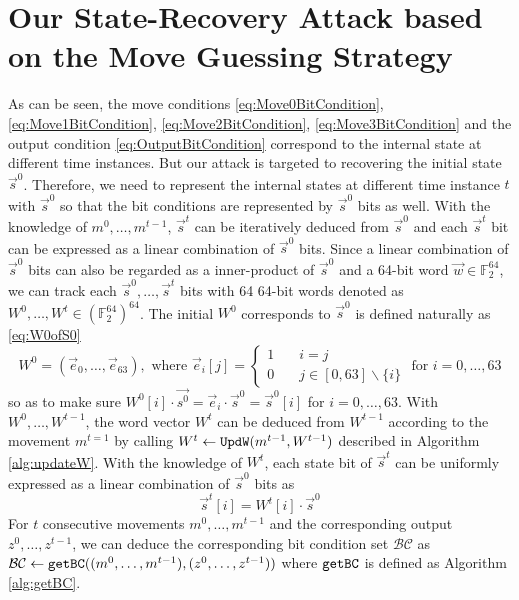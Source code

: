 \section{Our State-Recovery Attack based on the Move Guessing Strategy}\label{sec:OurGuessAndDetermine}
As can be seen, the move conditions \eqref{eq:Move0BitCondition}, \eqref{eq:Move1BitCondition}, \eqref{eq:Move2BitCondition}, \eqref{eq:Move3BitCondition} and the output condition \eqref{eq:OutputBitCondition} correspond to the internal state at different time instances.
But our attack is targeted to recovering the initial state $\vec{s}^0$.
Therefore, we need to represent the internal states at different time instance $t$ with $\vec{s}^0$ so that the bit conditions are represented by $\vec{s}^0$ bits as well.
With the knowledge of $m^0,\ldots, m^{t-1}$, $\vec{s}^{t}$ can be iteratively deduced from $\vec{s}^{0}$ and each $\vec{s}^{t}$ bit can be expressed as a linear combination of $\vec{s}^0$ bits. 
Since a linear combination of $\vec{s}^0$ bits can also be regarded as a inner-product of $\vec{s}^0$ and a 64-bit word $\vec w\in \mathbb{F}_2^{64}$, we can track each $\vec{s}^0,\ldots, \vec{s}^t$ bits with 64 64-bit words denoted as $W^0,\ldots, W^t\in (\mathbb{F}_2^{64})^{64}$.
The initial $W^0$ corresponds to $\vec{s}^0$ is defined naturally as \eqref{eq:W0ofS0}
\begin{equation}\label{eq:W0ofS0}
  W^0=(\vec e_0, \ldots, \vec e_{63}), \text{ where } \vec e_i[j]=\left\{
  \begin{split}
     1 &\quad i=j \\
     0 &\quad j\in [0,63]\backslash\{i\}
  \end{split}
  \right.\text{ for }i=0,\ldots, 63
\end{equation}
so as to make sure $W^0[i]\cdot \vec{s^0}=\vec{e}_i\cdot \vec{s}^0=\vec{s}^0[i]$ for $i=0,\ldots, 63$.
With $W^0,\ldots, W^{t-1}$, the word vector $W^{t}$ can be deduced from $W^{t-1}$ according to the movement $m^{t=1}$ by calling
$W^{t}\leftarrow {\tt UpdW}(m^{t-1}, W^{t-1})$ described in Algorithm \ref{alg:updateW}.
With the knowledge of $W^t$, each state bit of $\vec{s}^t$ can be uniformly expressed as a linear combination of $\vec{s}^0$ bits as
\begin{equation}\label{eq:ExpressStwithS0}
\vec{s}^t[i]=W^t[i]\cdot \vec{s}^0
\end{equation}
For $t$ consecutive movements $m^0,\ldots,m^{t-1}$ and the corresponding output $z^0,\ldots, z^{t-1}$, we can deduce the corresponding bit condition set $\mathcal{BC}$ as $\mathcal{BC}\leftarrow {\tt{getBC}}((m^0,\ldots, m^{t-1}), (z^0,\ldots, z^{t-1}))$ where ${\tt{getBC}}$ is defined as Algorithm \ref{alg:getBC}.
